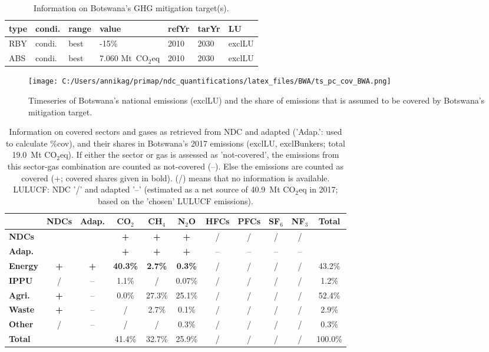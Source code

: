 \documentclass[12pt]{article}
\begin{document}
 \begin{table}[H]
 \centering
 \caption{Information on Botswana's GHG mitigation target(s).}
 \label{tab:mitiTars}
 \begin{tabular}{l l l l l l l }
 \bfseries type & \bfseries condi. & \bfseries range & \bfseries value & \bfseries refYr & \bfseries tarYr & \bfseries LU \tabularnewline \hline
 RBY & condi. & best & -15\% & 2010 & 2030 & exclLU \tabularnewline 
 ABS & condi. & best & 7.060 Mt~CO$_2$eq & 2010 & 2030 & exclLU \tabularnewline 
 \end{tabular}
 \end{table}

 \begin{figure}[H]
 \centering
 \texttt{[image: C:/Users/annikag/primap/ndc\_quantifications/latex\_files/BWA/ts\_pc\_cov\_BWA.png]}
 \caption{Timeseries of Botswana's national emissions (exclLU) and the share of emissions that is assumed to be covered by Botswana's mitigation target.}
 \label{fig:tsPcCov}
 \end{figure}

 \begin{table}[H]\small
 \centering
 \caption{Information on covered sectors and gases as retrieved from NDC and adapted ('Adap.': used to calculate \%cov), and their shares in Botswana's 2017 emissions (exclLU, exclBunkers; total 19.0~Mt CO$_2$eq).
 If either the sector or gas is assessed as 'not-covered', the emissions from this sector-gas combination are counted as not-covered (--). 
 Else the emissions are counted as covered (+; covered shares given in bold).
 (/) means that no information is available.
 LULUCF: NDC '/' and adapted '--' (estimated as a net source of 40.9~Mt CO$_2$eq in 2017; based on the 'chosen' LULUCF emissions).}
 \label{tab:coveredSectorsGases}
 \begin{tabular}{l || c c || c c c c c c c | c}
 \bfseries  & \bfseries NDCs & \bfseries Adap. & \bfseries CO$_2$ & \bfseries CH$_4$ & \bfseries N$_2$O & \bfseries HFCs & \bfseries PFCs & \bfseries SF$_6$ & \bfseries NF$_3$ & \bfseries Total \tabularnewline \hline \hline
 \bfseries NDCs &  &  & \bfseries + & \bfseries + & \bfseries + & / & / & / & / &  \tabularnewline 
 \bfseries Adap. &  &  & \bfseries + & \bfseries + & \bfseries + & -- & -- & -- & -- &  \tabularnewline \hline \hline
 \bfseries Energy & \bfseries + & \bfseries + & \bfseries 40.3\% & \bfseries 2.7\% & \bfseries 0.3\% & / & / & / & / & 43.2\% \tabularnewline 
 \bfseries IPPU & / & -- & 1.1\% & / & 0.07\% & / & / & / & / & 1.2\% \tabularnewline 
 \bfseries Agri. & \bfseries + & -- & 0.0\% & 27.3\% & 25.1\% & / & / & / & / & 52.4\% \tabularnewline 
 \bfseries Waste & \bfseries + & -- & / & 2.7\% & 0.1\% & / & / & / & / & 2.9\% \tabularnewline 
 \bfseries Other & / & -- & / & / & 0.3\% & / & / & / & / & 0.3\% \tabularnewline \hline
 \bfseries Total &  &  & 41.4\% & 32.7\% & 25.9\% & / & / & / & / & 100.0\% \tabularnewline 
 \end{tabular}
 \end{table}
\end{document}
